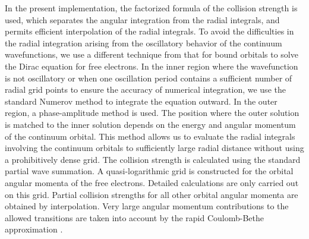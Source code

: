 In the present implementation, the factorized formula of the collision strength
is used, which separates the angular integration from the radial integrals, and
permits efficient interpolation of the radial integrals. To avoid the
difficulties in the radial integration arising from the oscillatory behavior of
the continuum wavefunctions, we use a different technique from that for bound
orbitals to solve the Dirac equation for free electrons. In the inner region
where the wavefunction is not oscillatory or when one oscillation period
contains  a sufficient number of radial grid points to ensure the accuracy of
numerical integration, we use the standard Numerov method to integrate the
equation  outward. In the outer region, a phase-amplitude method is used. The
position where the outer solution is matched to the inner solution depends on
the energy and angular momentum of the continuum orbital. This method allows us
to evaluate the radial integrals involving the continuum orbitals to
sufficiently large radial distance without using a prohibitively dense grid. The
collision strength is calculated using the standard partial wave summation. A
quasi-logarithmic grid is constructed for the orbital angular momenta of the
free electrons. Detailed calculations are only carried out on this grid. Partial
collision strengths for all other orbital angular momenta are obtained by
interpolation. Very large angular momentum contributions to the allowed
transitions are taken into account by the rapid Coulomb-Bethe approximation
\cite{burgess:1974a}. 

